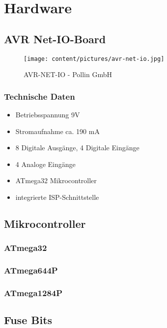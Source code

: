\chapter{Hardware}
\section{AVR Net-IO-Board}
\begin{figure}[h]
\centering
\texttt{[image: content/pictures/avr-net-io.jpg]}
\caption{AVR-NET-IO - Pollin GmbH}
\label{fig:B3}
\end{figure}

\subsection{Technische Daten}
\begin{itemize}
  \item Betriebsspannung 9V
  \item Stromaufnahme ca. 190 mA
  \item 8 Digitale Ausgänge, 4 Digitale Eingänge
  \item 4 Analoge Eingänge
  \item ATmega32 Mikrocontroller
  \item integrierte ISP-Schnittstelle
\end{itemize}

\section{Mikrocontroller}
\subsection{ATmega32}

\subsection{ATmega644P}

\subsection{ATmega1284P}

\section{Fuse Bits}


